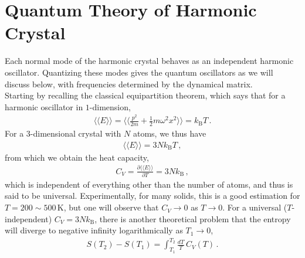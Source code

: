 \documentclass[11pt, oneside]{book}
\theoremstyle{break}
\theoremstyle{break}
\newcommand{\pd}{\partial}
\begin{document}
\newpage
\section{Quantum Theory of Harmonic Crystal}
Each normal mode of the harmonic crystal behaves as an independent harmonic oscillator. Quantizing these modes gives the quantum oscillators as we will discuss below, with frequencies determined by the dynamical matrix.\\

Starting by recalling the classical equipartition theorem, which says that for a harmonic oscillator in $1$-dimension, 
\begin{align*}
\langle\langle E \rangle\rangle = \langle \langle \frac{p^2}{2m} + \frac{1}{2}m\omega^2 x^2\rangle\rangle = k_{\text{B}}T\,.
\end{align*}
For a $3$-dimensional crystal with $N$ atoms, we thus have 
\begin{align*}
\langle\langle E\rangle\rangle = 3N k_{\text{B}}T \,,
\end{align*}
from which we obtain the heat capacity, 
\begin{align*}
C_V = \frac{\pd \langle\langle E\rangle\rangle}{\pd T} = 3N k_{\text{B}}\,,
\end{align*}
which is independent of everything other than the number of atoms, and thus is said to be universal. Experimentally, for many solids, this is a good estimation for $T = 200\sim 500$\,K, but one will observe that $C_V \to 0$ as $T \to 0$. For a universal ($T$-independent) $C_V = 3Nk_{\text{B}}$, there is another theoretical problem that the entropy will diverge to negative infinity logarithmically as $T_1 \to 0$, 
\begin{align*}
S(T_2) - S(T_1) = \int_{T_1}^{T_2} \frac{dT}{T}\, C_V(T)\,.
\end{align*} 
\end{document}
